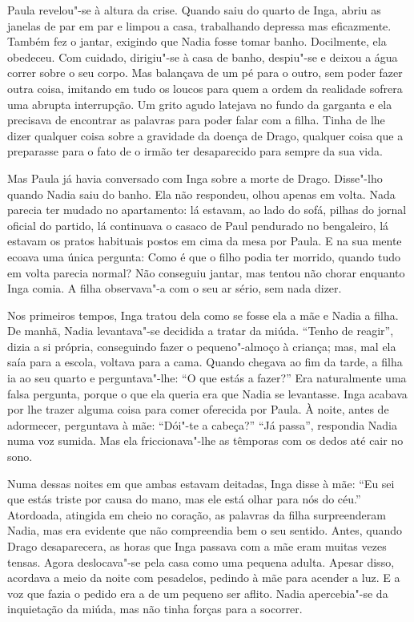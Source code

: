Paula revelou"-se à altura da crise. Quando saiu do quarto de Inga, abriu
as janelas de par em par e limpou a casa, trabalhando depressa mas
eficazmente. Também fez o jantar, exigindo que Nadia fosse tomar banho.
Docilmente, ela obedeceu. Com cuidado, dirigiu"-se à casa de banho,
despiu"-se e deixou a água correr sobre o seu corpo. Mas balançava de um
pé para o outro, sem poder fazer outra coisa, imitando em tudo os loucos
para quem a ordem da realidade sofrera uma abrupta interrupção. Um grito
agudo latejava no fundo da garganta e ela precisava de encontrar as
palavras para poder falar com a filha.
Tinha de lhe dizer qualquer coisa sobre a gravidade da doença de Drago,
qualquer coisa que a preparasse para o fato de o irmão ter desaparecido
para sempre da sua vida.

Mas Paula já havia conversado com Inga sobre a
morte de Drago. Disse"-lho quando Nadia saiu do banho. Ela não respondeu,
olhou apenas em volta. Nada parecia ter mudado no apartamento: lá
estavam, ao lado do sofá, pilhas do jornal oficial do partido, lá
continuava o casaco de Paul pendurado no bengaleiro, lá estavam os
pratos habituais postos em cima da mesa por Paula. E na sua mente ecoava
uma única pergunta: Como é que o filho podia ter morrido, quando tudo em
volta parecia normal? Não conseguiu jantar, mas tentou não chorar
enquanto Inga comia. A filha observava"-a com o seu ar sério, sem
nada dizer.

Nos primeiros tempos, Inga tratou dela como se fosse ela a mãe e Nadia a
filha. De manhã, Nadia levantava"-se decidida a tratar da miúda. ``Tenho
de reagir'', dizia a si própria, conseguindo fazer o pequeno"-almoço à
criança; mas, mal ela saía para a escola, voltava para a cama. Quando
chegava ao fim da tarde, a filha ia ao seu quarto e perguntava"-lhe: ``O
que estás a fazer?'' Era naturalmente uma falsa pergunta, porque o que
ela queria era que Nadia se levantasse. Inga acabava por lhe trazer
alguma coisa para comer oferecida por Paula. À noite, antes de adormecer, perguntava à mãe: ``Dói"-te a cabeça?'' ``Já passa'', respondia Nadia
numa voz sumida. Mas ela friccionava"-lhe as têmporas com os dedos até
cair no sono.

Numa dessas noites em que ambas estavam deitadas,
Inga disse à mãe: ``Eu sei que estás triste por causa do
mano, mas ele está olhar para nós do céu.'' Atordoada, atingida em cheio
no coração, as palavras da filha surpreenderam Nadia, mas era evidente
que não compreendia bem o seu sentido. Antes, quando Drago desaparecera,
as horas que Inga passava com a mãe eram muitas vezes tensas. Agora
deslocava"-se pela casa como uma pequena adulta. Apesar disso, acordava a
meio da noite com pesadelos, pedindo à mãe para acender a luz. E a voz
que fazia o pedido era a de um pequeno ser aflito. Nadia apercebia"-se da inquietação da miúda, mas não tinha forças para a socorrer.

